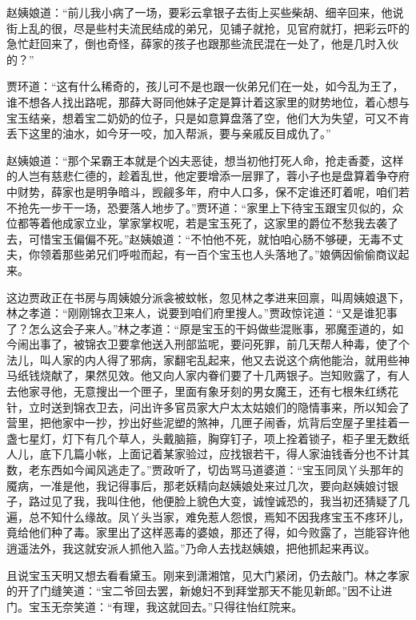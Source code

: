 \documentclass[12pt,oneside]{book}
\begin{document}
赵姨娘道：“前儿我小病了一场，要彩云拿银子去街上买些柴胡、细辛回来，他说街上乱的很，尽是些村夫流民结成的弟兄，见铺子就抢，见官府就打，把彩云吓的急忙赶回来了，倒也奇怪，薛家的孩子也跟那些流民混在一处了，他是几时入伙的？”

贾环道：“这有什么稀奇的，孩儿可不是也跟一伙弟兄们在一处，如今乱为王了，谁不想各人找出路呢，那薛大哥同他妹子定是算计着这家里的财势地位，着心想与宝玉结亲，想着宝二奶奶的位子，只是如意算盘落了空，他们大为失望，可又不肯丢下这里的油水，如今牙一咬，加入帮派，要与亲戚反目成仇了。”

赵姨娘道：“那个呆霸王本就是个凶夫恶徒，想当初他打死人命，抢走香菱，这样的人岂有慈悲仁德的，趁着乱世，他定要增添一层罪了，蓉小子也是盘算着争夺府中财势，薛家也是明争暗斗，觊觎多年，府中人口多，保不定谁还盯着呢，咱们若不抢先一步干一场，恐要落人地步了。”贾环道：“家里上下待宝玉跟宝贝似的，众位都等着他成家立业，掌家掌权呢，若是宝玉死了，这家里的爵位不愁我去袭了去，可惜宝玉偏偏不死。”赵姨娘道：“不怕他不死，就怕咱心肠不够硬，无毒不丈夫，你领着那些弟兄们呼啦而起，有一百个宝玉也人头落地了。”娘俩因偷偷商议起来。

这边贾政正在书房与周姨娘分派衾被蚊帐，忽见林之孝进来回禀，叫周姨娘退下，林之孝道：“刚刚锦衣卫来人，说要到咱们府里搜人。”贾政惊诧道：“又是谁犯事了？怎么这会子来人。”林之孝道：“原是宝玉的干妈做些混账事，邪魔歪道的，如今闹出事了，被锦衣卫要拿他送入刑部监呢，要问死罪，前几天帮人种毒，使了个法儿，叫人家的内人得了邪病，家翻宅乱起来，他又去说这个病他能治，就用些神马纸钱烧献了，果然见效。他又向人家内眷们要了十几两银子。岂知败露了，有人去他家寻他，无意搜出一个匣子，里面有象牙刻的男女魔王，还有七根朱红绣花针，立时送到锦衣卫去，问出许多官员家大户太太姑娘们的隐情事来，所以知会了营里，把他家中一抄，抄出好些泥塑的煞神，几匣子闹香，炕背后空屋子里挂着一盏七星灯，灯下有几个草人，头戴脑箍，胸穿钉子，项上拴着锁子，柜子里无数纸人儿，底下几篇小帐，上面记着某家验过，应找银若干，得人家油钱香分也不计其数，老东西如今闻风逃走了。”贾政听了，切齿骂马道婆道：“宝玉同凤丫头那年的魇病，一准是他，我记得事后，那老妖精向赵姨娘处来过几次，要向赵姨娘讨银子，路过见了我，我叫住他，他便脸上貌色大变，诚惶诚恐的，我当初还猜疑了几遍，总不知什么缘故。凤丫头当家，难免惹人怨恨，焉知不因我疼宝玉不疼环儿，竟给他们种了毒。家里出了这样恶毒的婆娘，那还了得，如今败露了，岂能容许他逍遥法外，我这就安派人抓他入监。”乃命人去找赵姨娘，把他抓起来再议。

且说宝玉天明又想去看看黛玉。刚来到潇湘馆，见大门紧闭，仍去敲门。林之孝家的开了门缝笑道：“宝二爷回去罢，新媳妇不到拜堂那天不能见新郎。”因不让进门。宝玉无奈笑道：“有理，我这就回去。”只得往怡红院来。
\end{document}
